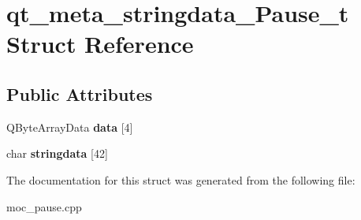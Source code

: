 \hypertarget{structqt__meta__stringdata___pause__t}{\section{qt\-\_\-meta\-\_\-stringdata\-\_\-\-Pause\-\_\-t Struct Reference}
\label{structqt__meta__stringdata___pause__t}
}
\subsection*{Public Attributes}
\begin{DoxyCompactItemize}
\item 
\hypertarget{structqt__meta__stringdata___pause__t_a0db72ef1c0f4f2b70a413bfb498ba07e}{Q\-Byte\-Array\-Data {\bfseries data} \mbox{[}4\mbox{]}}\label{structqt__meta__stringdata___pause__t_a0db72ef1c0f4f2b70a413bfb498ba07e}

\item 
\hypertarget{structqt__meta__stringdata___pause__t_ad4433c46256c70c2634dcf0c941a2476}{char {\bfseries stringdata} \mbox{[}42\mbox{]}}\label{structqt__meta__stringdata___pause__t_ad4433c46256c70c2634dcf0c941a2476}

\end{DoxyCompactItemize}


The documentation for this struct was generated from the following file\-:\begin{DoxyCompactItemize}
\item 
moc\-\_\-pause.\-cpp\end{DoxyCompactItemize}
